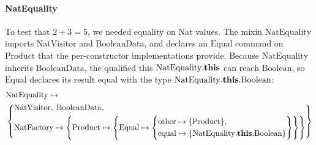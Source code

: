 \paragraph{NatEquality}
\label{sec:nat-equality}
To test that $2 + 3 = 5$, we needed equality on Nat values.
The mixin $\mathrm{NatEquality}$ imports $\mathrm{NatVisitor}$ and $\mathrm{BooleanData}$,
and declares an $\mathrm{Equal}$ command on $\mathrm{Product}$ that the per-constructor implementations provide.
Because $\mathrm{NatEquality}$ inherits $\mathrm{BooleanData}$,
the qualified this $\mathrm{NatEquality}.\mathbf{this}$ can reach $\mathrm{Boolean}$,
so $\mathrm{Equal}$ declares its result
$\mathrm{equal}$ with the type $\mathrm{NatEquality}.\mathbf{this}.\mathrm{Boolean}$:
\[
  \begin{aligned}
    &\mathrm{NatEquality} \mapsto \\
    &\left\{
    \begin{aligned}
      &\mathrm{NatVisitor},\; \mathrm{BooleanData},\\
      &\mathrm{NatFactory} \mapsto \left\{\mathrm{Product} \mapsto \left\{\mathrm{Equal} \mapsto \left\{
          \begin{aligned}
            &\mathrm{other} \mapsto \{\mathrm{Product}\},\\
            &\mathrm{equal} \mapsto \{\mathrm{NatEquality}.\mathbf{this}.\mathrm{Boolean}\}
      \end{aligned}\right\}\right\}\right\}
  \end{aligned}\right\}
  \end{aligned}
\]

